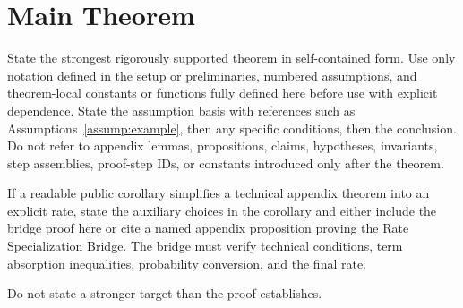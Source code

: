 \section{Main Theorem}

\begin{theorem}\label{thm:main}
State the strongest rigorously supported theorem in self-contained form. Use
only notation defined in the setup or preliminaries, numbered assumptions, and
theorem-local constants or functions fully defined here before use with explicit
dependence. State the assumption basis with references such as
Assumptions~\ref{assump:example}, then any specific conditions, then the
conclusion. Do not refer to appendix lemmas, propositions, claims, hypotheses,
invariants, step assemblies, proof-step IDs, or constants introduced only after
the theorem.
\end{theorem}

If a readable public corollary simplifies a technical appendix theorem into an
explicit rate, state the auxiliary choices in the corollary and either include
the bridge proof here or cite a named appendix proposition proving the Rate
Specialization Bridge. The bridge must verify technical conditions, term
absorption inequalities, probability conversion, and the final rate.

Do not state a stronger target than the proof establishes.
